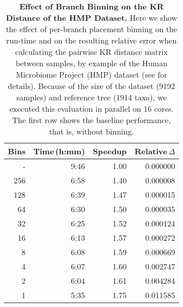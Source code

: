 \begin{table}[htb]
\caption[Effect of Branch Binning on the KR Distance of the HMP Dataset]{
    \textbf{Effect of Branch Binning on the KR Distance of the HMP Dataset.}
    Here we show the effect of per-branch placement binning
    on the run-time and on the resulting relative error when calculating the pairwise KR distance matrix between samples,
    by example of the Human Microbiome Project (HMP) \cite{Huttenhower2012,Methe2012} dataset
    (see  for details).
    Because of the size of the dataset (\num{9192} samples) and reference tree (\num{1914} taxa),
    we executed this evaluation in parallel on \num{16} cores.
    The first row shows the baseline performance, that is, without binning.
}
\label{tab:hmp_binning_error}
{
    \begin{center}
    \begin{tabular}{rrrr}
        \toprule
        Bins    &  Time\,(h:mm) &  Speedup  &  Relative\,$\Delta$ \\
        \midrule
        -     & 9:46   & 1.00   & 0.000000 \\
        256   & 6:58   & 1.40   & 0.000008 \\
        128   & 6:39   & 1.47   & 0.000015 \\
        64    & 6:30   & 1.50   & 0.000035 \\
        32    & 6:25   & 1.52   & 0.000124 \\
        16    & 6:13   & 1.57   & 0.000272 \\
        8     & 6:08   & 1.59   & 0.000669 \\
        4     & 6:07   & 1.60   & 0.002747 \\
        2     & 6:04   & 1.61   & 0.004284 \\
        1     & 5:35   & 1.75   & 0.011585 \\
        \bottomrule
    \end{tabular}
    \end{center}
}
\end{table}

